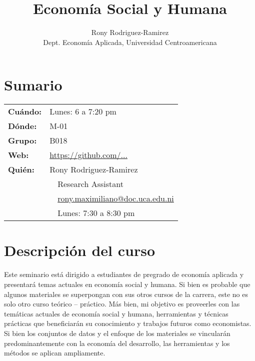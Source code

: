 \documentclass[12]{article}
\newcommand{\subtitle}[1]{%
	\posttitle{%
		\par\end{center}
	\begin{center}\large#1\end{center}
	\vskip0.5em}%
}
\begin{document}
\title{Economía Social y Humana}
\subtitle{\textsc{2019 syllabus}\vspace{-2ex}}
\author{Rony Rodriguez-Ramirez\\ Dept. Economía Aplicada, Universidad Centroamericana}
\date{\vspace{-5ex}}

\maketitle

\section*{Sumario}

\begin{tabular}{ll} 
	\textbf{Cuándo:} 	& Lunes: 6 a 7:20 pm \\
	\textbf{Dónde:} 	& M-01 \\
	\textbf{Grupo:}		& B018 \\
	\textbf{Web:} 		& \href{https://github.com/...}{https://github.com/...} \\
	\textbf{Quién:} 	& Rony Rodriguez-Ramirez \\
						& \, \faMortarBoard 	\, Research Assistant \\
						& \, \faEnvelopeO 		\, \href{mailto:rony.maximiliano@doc.uca.edu.ni}{rony.maximiliano@doc.uca.edu.ni} \\
						& \, \faHourglassHalf 	\, Lunes: 7:30 a 8:30 pm  \\
\end{tabular} 

\section*{Descripción del curso}

Este seminario está dirigido a estudiantes de pregrado de economía aplicada y presentará temas actuales en economía
social y humana. Si bien es probable que algunos materiales se superpongan con sus otros cursos de 
la carrera, este no es solo otro curso teórico – práctico. Más bien, mi objetivo es proveerles con las temáticas actuales 
de economía social y humana, herramientas y técnicas prácticas que beneficiarán su conocimiento y trabajos futuros como 
economistas. Si  bien los conjuntos de datos y el enfoque de los materiales se vincularán predominantemente con la 
economía del desarrollo, las herramientas y los métodos se aplican ampliamente.
\end{document}
